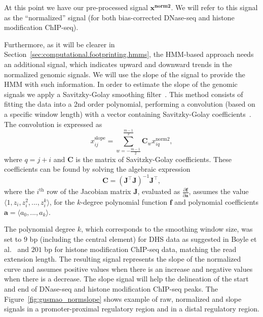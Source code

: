 At this point we have our pre-processed signal $\mathbf{{x}^{\text{norm2}}}$. We will refer to this signal as the ``normalized'' signal (for both bias-corrected DNase-seq and histone modification ChIP-seq).

Furthermore, as it will be clearer in Section~\ref{sec:computational.footprinting.hmms}, the HMM-based approach needs an additional signal, which indicates upward and downward trends in the normalized genomic signals. We will use the slope of the signal to provide the HMM with such information. In order to estimate the slope of the genomic signals we apply a Savitzky-Golay smoothing filter~\cite{madden1978,luo2005}. This method consists of fitting the data into a 2nd order polynomial, performing a convolution (based on a specific window length) with a vector containing Savitzky-Golay coefficients~\cite{madden1978}. The convolution is expressed as
\begin{equation}
  \label{eq:slope}
  {x}^{\text{slope}}_{ij} = \sum\limits_{w=-\frac{m-1}{2}}^{\frac{m-1}{2}} {\mathbf{C}}_{w} {x}^{\text{norm2}}_{iq},
\end{equation}
where $q=j+i$ and $\mathbf{C}$ is the matrix of Savitzky-Golay coefficients. These coefficients can be found by solving the algebraic expression
\begin{equation}
  \label{eq:savitzky.golay.coeff}
  \mathbf{C} = {\left( \mathbf{J}^{\intercal} \mathbf{J} \right)}^{-1} \mathbf{J}^{\intercal},
\end{equation}
where the $i^{\text{th}}$ row of the Jacobian matrix $\mathbf{J}$, evaluated as $ \frac{\partial \mathbf{f}}{\partial \mathbf{a}} $, assumes the value $ \langle 1, {z}_{i}, {z}_{i}^{2}, ..., {z}_{i}^{k} \rangle $, for the $k$-degree polynomial function $\mathbf{f}$ and polynomial coefficients $ \mathbf{a} = \langle {a}_{0}, ..., {a}_{k} \rangle $.

The polynomial degree $k$, which corresponds to the smoothing window size, was set to $9$ bp (including the central element) for DHS data as suggested in Boyle et al.~\cite{boyle2011} and $201$ bp for histone modification ChIP-seq data, matching the read extension length. The resulting signal represents the slope of the normalized curve and assumes positive values when there is an increase and negative values when there is a decrease. The slope signal will help the delineation of the start and end of DNase-seq and histone modification ChIP-seq peaks. The Figure~\ref{fig:gusmao_normslope} shows example of raw, normalized and slope signals in a promoter-proximal regulatory region and in a distal regulatory region.


